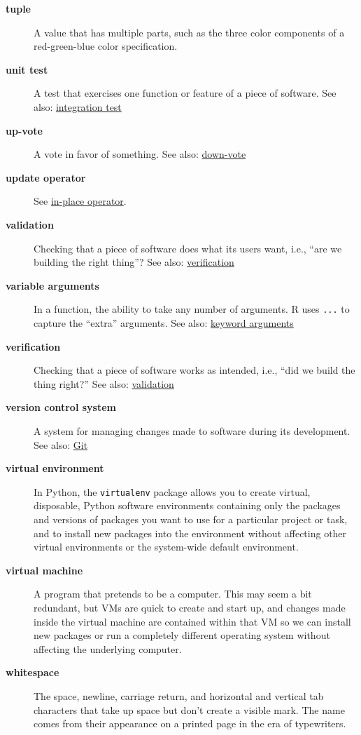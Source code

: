 \documentclass[
]{krantz}
\begin{document}
\begin{description}
\item[\textbf{tuple}]
A value that has multiple parts, such as the three color components of a red-green-blue color specification.
\item[\textbf{unit test}]
A test that exercises one function or feature of a piece of software. See also: \protect\hyperlink{integration_test}{integration test}
\item[\textbf{up-vote}]
A vote in favor of something. See also: \protect\hyperlink{down_vote}{down-vote}
\item[\textbf{update operator}]
See \protect\hyperlink{in_place_operator}{in-place operator}.
\item[\textbf{validation}]
Checking that a piece of software does what its users want, i.e., ``are we building the right thing''? See also: \protect\hyperlink{verification}{verification}
\item[\textbf{variable arguments}]
In a function, the ability to take any number of arguments. R uses \texttt{...} to capture the ``extra'' arguments. See also: \protect\hyperlink{keyword_arguments}{keyword arguments}
\item[\textbf{verification}]
Checking that a piece of software works as intended, i.e., ``did we build the thing right?'' See also: \protect\hyperlink{validation}{validation}
\item[\textbf{version control system}]
A system for managing changes made to software during its development. See also: \protect\hyperlink{git}{Git}
\item[\textbf{virtual environment}]
In Python, the \texttt{virtualenv} package allows you to create virtual, disposable, Python software environments containing only the packages and versions of packages you want to use for a particular project or task, and to install new packages into the environment without affecting other virtual environments or the system-wide default environment.
\item[\textbf{virtual machine}]
A program that pretends to be a computer. This may seem a bit redundant, but VMs are quick to create and start up, and changes made inside the virtual machine are contained within that VM so we can install new packages or run a completely different operating system without affecting the underlying computer.
\item[\textbf{whitespace}]
The space, newline, carriage return, and horizontal and vertical tab characters that take up space but don't create a visible mark. The name comes from their appearance on a printed page in the era of typewriters.

\end{description}
\end{document}

